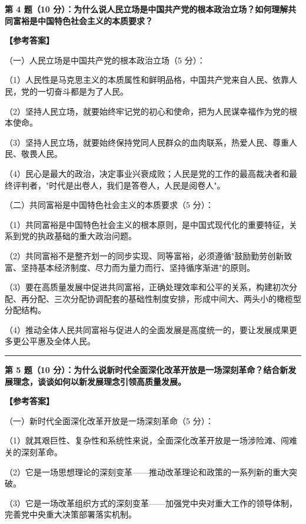 \documentclass[12pt, a4paper]{article}
\begin{document}
\begin{answerbox}
\noindent\textbf{第 4 题（10 分）：为什么说人民立场是中国共产党的根本政治立场？如何理解共同富裕是中国特色社会主义的本质要求？}

\vspace{4pt}
\textbf{【参考答案】}

\noindent（一）人民立场是中国共产党的根本政治立场（5 分）：

（1）人民性是马克思主义的本质属性和鲜明品格，中国共产党来自人民、依靠人民，党的一切奋斗都是为了人民。

（2）坚持人民立场，就要始终牢记党的初心和使命，把为人民谋幸福作为党的根本使命。

（3）坚持人民立场，就要始终保持党同人民群众的血肉联系，热爱人民、尊重人民、敬畏人民。

（4）民心是最大的政治，决定事业兴衰成败；人民是党的工作的最高裁决者和最终评判者，"时代是出卷人，我们是答卷人，人民是阅卷人"。

\noindent（二）共同富裕是中国特色社会主义的本质要求（5 分）：

（1）共同富裕是中国特色社会主义的根本原则，是中国式现代化的重要特征，关系到党的执政基础的重大政治问题。

（2）共同富裕不是整齐划一的同步实现、同等富裕，必须遵循"鼓励勤劳创新致富、坚持基本经济制度、尽力而为量力而行、坚持循序渐进"的原则。

（3）要在高质量发展中促进共同富裕，正确处理效率和公平的关系，构建初次分配、再分配、三次分配协调配套的基础性制度安排，形成中间大、两头小的橄榄型分配结构。

（4）推动全体人民共同富裕与促进人的全面发展是高度统一的，要让发展成果更多更公平惠及全体人民。

\vspace{6pt}
\noindent\rule{\linewidth}{0.4pt}
\vspace{4pt}

\noindent\textbf{第 5 题（10 分）：为什么说新时代全面深化改革开放是一场深刻革命？结合新发展理念，谈谈如何以新发展理念引领高质量发展。}

\vspace{4pt}
\textbf{【参考答案】}

\noindent（一）新时代全面深化改革开放是一场深刻革命（5 分）：

（1）就其艰巨性、复杂性和系统性来说，全面深化改革开放是一场涉险滩、闯难关的深刻革命。

（2）它是一场思想理论的深刻变革——推动改革理论和政策的一系列新的重大突破。

（3）它是一场改革组织方式的深刻变革——加强党中央对重大工作的领导体制，完善党中央重大决策部署落实机制。


\end{answerbox}
\end{document}
